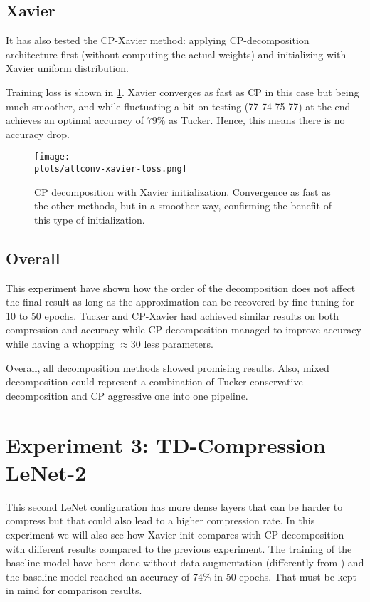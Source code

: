 \subsection{Xavier}
It has also tested the CP-Xavier method: applying CP-decomposition architecture first (without computing the actual weights) and initializing with Xavier uniform distribution. %
\newline 

Training loss is shown in \ref{fig:allconv-xavier}. Xavier converges as fast as CP in this case but being much smoother, and while fluctuating a bit on testing (77-74-75-77) at the end achieves an optimal accuracy of $79\%$ as Tucker. Hence, this means there is no accuracy drop. 


 \begin{figure}[h!]
 \centering
 \texttt{[image: \\plots/allconv-xavier-loss.png]} 
 \caption{CP decomposition with Xavier initialization. Convergence as fast as the other methods, but in a smoother way, confirming the benefit of this type of initialization. }
 \label{fig:allconv-xavier}
\end{figure}


\subsection{Overall}
This experiment have shown how the order of the decomposition does not affect the final result as long as the approximation can be recovered by fine-tuning for 10 to 50 epochs. Tucker and CP-Xavier had achieved similar results on both compression and accuracy while CP decomposition managed to improve accuracy while having a whopping $\approx 30$ less parameters. 

Overall, all decomposition methods showed promising results. Also, mixed decomposition could represent a combination of Tucker conservative decomposition and CP aggressive one into one pipeline. 



\section{Experiment 3: TD-Compression LeNet-2}
This second LeNet configuration has more dense layers that can be harder to compress but that could also lead to a higher compression rate. In this experiment we will also see how Xavier init compares with CP decomposition with different results compared to the previous experiment. The training of the baseline model have been done without data augmentation (differently from \parencite{zhang2015SVD}) and the baseline model reached an accuracy of 74\% in 50 epochs. That must be kept in mind for comparison results. 

